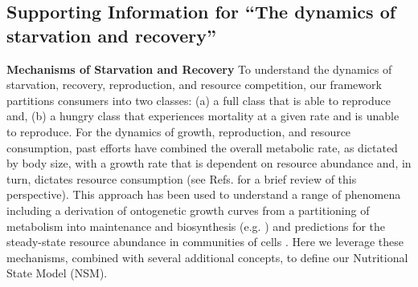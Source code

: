 \documentclass[twocolumn,preprintnumbers,amsmath,amssymb,superscriptaddress]{revtex4}
\begin{document}
% 



%
%
\clearpage

\begin{bibunit}[unsrt]


\setcounter{table}{0}
\renewcommand{\thetable}{S\arabic{table}}%
\setcounter{figure}{0}
\renewcommand{\thefigure}{S\arabic{figure}}%


\section*{Supporting Information for ``The dynamics of starvation and recovery''}

{\bf Mechanisms of Starvation and Recovery}
To understand the dynamics of starvation, recovery, reproduction, and resource competition, our framework partitions consumers into two classes: (a) a full class that is able to reproduce and, (b) a hungry class that experiences mortality at a given rate and is unable to reproduce. For the dynamics of growth, reproduction, and resource consumption, past efforts have combined the overall metabolic rate, as dictated by body size, with a growth rate that is dependent on resource abundance and, in turn, dictates resource consumption (see Refs. \citep{Kempes:2012hy,kempes2014morphological} for a brief review of this perspective). This approach has been used to understand a range of phenomena including a derivation of ontogenetic growth curves from a partitioning of metabolism into maintenance and biosynthesis (e.g. \citep{West:2001bv,moses2008rmo,hou,Kempes:2012hy}) and predictions for the steady-state resource abundance in communities of cells \citep{kempes2014morphological}. Here we leverage these mechanisms, combined with several additional concepts, to define our Nutritional State Model (NSM).


\end{bibunit}
\end{document}
